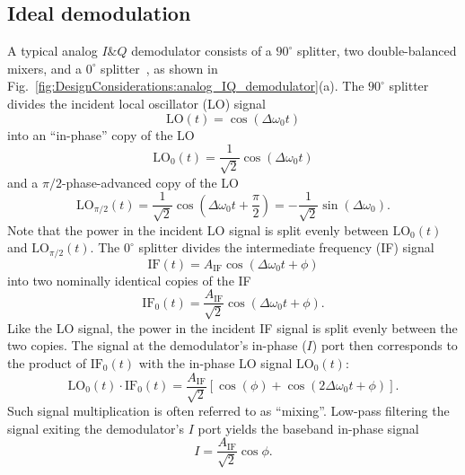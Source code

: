 \subsection{Ideal demodulation}
\label{sec:DesignConsiderations:demodulation:ideal}
A typical analog $I\&Q$ demodulator consists of
a $90^{\circ}$ splitter,
two double-balanced mixers, and
a $0^{\circ}$ splitter~\cite{minicircuits_modulators}, as shown in
Fig.~\ref{fig:DesignConsiderations:analog_IQ_demodulator}(a).
The $90^{\circ}$ splitter divides the incident local oscillator (LO) signal
\begin{equation}
  \text{LO}(t) = \cos(\Delta\omega_0 t)
\end{equation}
into an ``in-phase'' copy of the LO
\begin{equation}
  \text{LO}_0(t)
  =
  \frac{1}{\sqrt{2}} \cos(\Delta\omega_0 t)
\end{equation}
and a $\pi / 2$-phase-advanced copy of the LO
\begin{equation}
  \text{LO}_{\pi / 2}(t)
  =
  \frac{1}{\sqrt{2}} \cos\left( \Delta\omega_0 t + \frac{\pi}{2} \right)
  =
  - \frac{1}{\sqrt{2}} \sin(\Delta\omega_0).
\end{equation}
Note that the power in the incident LO signal
is split evenly between $\text{LO}_0(t)$ and $\text{LO}_{\pi / 2}(t)$.
The $0^{\circ}$ splitter divides the intermediate frequency (IF) signal
\begin{equation}
  \text{IF}(t) = A_{\text{IF}} \cos(\Delta\omega_0 t + \phi)
\end{equation}
into two nominally identical copies of the IF
\begin{equation}
  \text{IF}_0(t)
  =
  \frac{A_{\text{IF}}}{\sqrt{2}} \cos(\Delta\omega_0 t + \phi).
\end{equation}
Like the LO signal, the power in the incident IF signal
is split evenly between the two copies.
The signal at the demodulator's in-phase ($I$) port
then corresponds to the product of
$\text{IF}_0(t)$ with the in-phase LO signal $\text{LO}_0(t)$:
\begin{equation}
  \text{LO}_0(t) \cdot \text{IF}_0(t)
  =
  \frac{A_{\text{IF}}}{\sqrt{2}}
  \left[
    \cos(\phi) + \cos(2 \Delta\omega_0 t + \phi)
  \right].
\end{equation}
Such signal multiplication is often referred to as ``mixing''.
Low-pass filtering the signal exiting the demodulator's $I$ port
yields the baseband in-phase signal
\begin{equation}
  I = \frac{A_{\text{IF}}}{\sqrt{2}} \cos\phi.
\end{equation}
